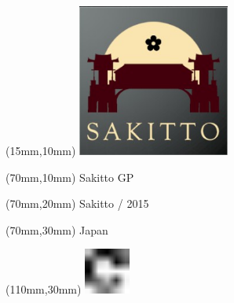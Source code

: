\null\newpage
\begin{textblock*}{50mm}(15mm,10mm)%
\includegraphics[width=50mm]{LG/2015-05-20_00093.png}
\end{textblock*}
\begin{textblock*}{130mm}(70mm,10mm)%
{\fontsize{20}{20}\selectfont Sakitto GP}\\
\end{textblock*}
\begin{textblock*}{120mm}(70mm,20mm)%
{\fontsize{16}{16}\selectfont Sakitto / 2015}\\
\end{textblock*}
\begin{textblock*}{120mm}(70mm,30mm)%
{\fontsize{12}{12}\selectfont Japan}
\end{textblock*}
\begin{textblock*}{30mm}(110mm,30mm)%
\centering
\includegraphics[height=15mm]{icons/fa-rotate-right.pdf}
\end{textblock*}
